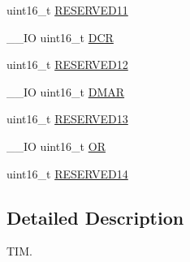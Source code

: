 \begin{DoxyCompactItemize}
\item 
uint16\-\_\-t \hyperlink{struct_t_i_m___type_def_a11e504ee49142f46dcc67740ae9235e5}{R\-E\-S\-E\-R\-V\-E\-D11}
\item 
\-\_\-\-\_\-\-I\-O uint16\-\_\-t \hyperlink{struct_t_i_m___type_def_a0afd527a4ec64faf878f9957096102bf}{D\-C\-R}
\item 
uint16\-\_\-t \hyperlink{struct_t_i_m___type_def_a2f133f27cf624e76a2ac1092ab5789f7}{R\-E\-S\-E\-R\-V\-E\-D12}
\item 
\-\_\-\-\_\-\-I\-O uint16\-\_\-t \hyperlink{struct_t_i_m___type_def_a30c2d8aa9c76dfba0b9a378b64700bda}{D\-M\-A\-R}
\item 
uint16\-\_\-t \hyperlink{struct_t_i_m___type_def_a85b970173fe49d3959c0c7f7528dacf0}{R\-E\-S\-E\-R\-V\-E\-D13}
\item 
\-\_\-\-\_\-\-I\-O uint16\-\_\-t \hyperlink{struct_t_i_m___type_def_a47766f433b160258ec05dbb6498fd271}{O\-R}
\item 
uint16\-\_\-t \hyperlink{struct_t_i_m___type_def_a1841fa0366924d522d6ac880fb14d766}{R\-E\-S\-E\-R\-V\-E\-D14}
\end{DoxyCompactItemize}


\subsection{Detailed Description}
T\-I\-M. 

